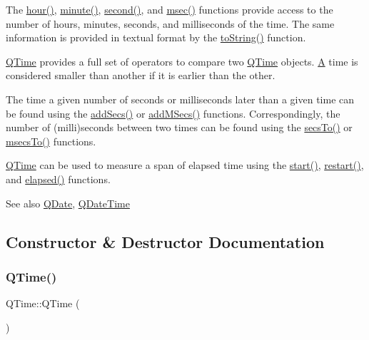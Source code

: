 The \mbox{\hyperlink{class_q_time_a228b4c7467705db31821dadd5ec9101b}{hour()}}, \mbox{\hyperlink{class_q_time_a229f09c7a639dc11990463d827fa5137}{minute()}}, \mbox{\hyperlink{class_q_time_ab313147e79b92a374963a0e238acb071}{second()}}, and \mbox{\hyperlink{class_q_time_a88ab10ec33b877a15bb0d0c7971de90e}{msec()}} functions provide access to the number of hours, minutes, seconds, and milliseconds of the time. The same information is provided in textual format by the \mbox{\hyperlink{class_q_time_a87ef6af883b329327e1665cc639d403c}{to\+String()}} function.

\mbox{\hyperlink{class_q_time}{Q\+Time}} provides a full set of operators to compare two \mbox{\hyperlink{class_q_time}{Q\+Time}} objects. \mbox{\hyperlink{class_a}{A}} time is considered smaller than another if it is earlier than the other.

The time a given number of seconds or milliseconds later than a given time can be found using the \mbox{\hyperlink{class_q_time_ae5ba40307760c49c56896da08d69c363}{add\+Secs()}} or \mbox{\hyperlink{class_q_time_a1b43598c5d992242f13afe4e13a1e59f}{add\+M\+Secs()}} functions. Correspondingly, the number of (milli)seconds between two times can be found using the \mbox{\hyperlink{class_q_time_a8193498cc40d7386b23df740fa326b2b}{secs\+To()}} or \mbox{\hyperlink{class_q_time_acc9338f7c222afcf5cf29d7bb6d40667}{msecs\+To()}} functions.

\mbox{\hyperlink{class_q_time}{Q\+Time}} can be used to measure a span of elapsed time using the \mbox{\hyperlink{class_q_time_aafacb3c8da8d383b7e688f6df20c8835}{start()}}, \mbox{\hyperlink{class_q_time_ae4031d9d548cfa663c03d64ac6eb32f6}{restart()}}, and \mbox{\hyperlink{class_q_time_ae6223ec2c678edc4c0b4e8b4d51091c8}{elapsed()}} functions.

\begin{DoxySeeAlso}{See also}
\mbox{\hyperlink{class_q_date}{Q\+Date}}, \mbox{\hyperlink{class_q_date_time}{Q\+Date\+Time}} 
\end{DoxySeeAlso}


\subsection{Constructor \& Destructor Documentation}
\mbox{\label{class_q_time_acf8e9864d7d793eda72d68481e9c2387}} 
\subsubsection{\texorpdfstring{QTime()}{QTime()}\hspace{0.1cm}{\footnotesize\ttfamily [1/2]}}
{\footnotesize\ttfamily Q\+Time\+::\+Q\+Time (\begin{DoxyParamCaption}{ }\end{DoxyParamCaption})\hspace{0.3cm}{\ttfamily [inline]}}

